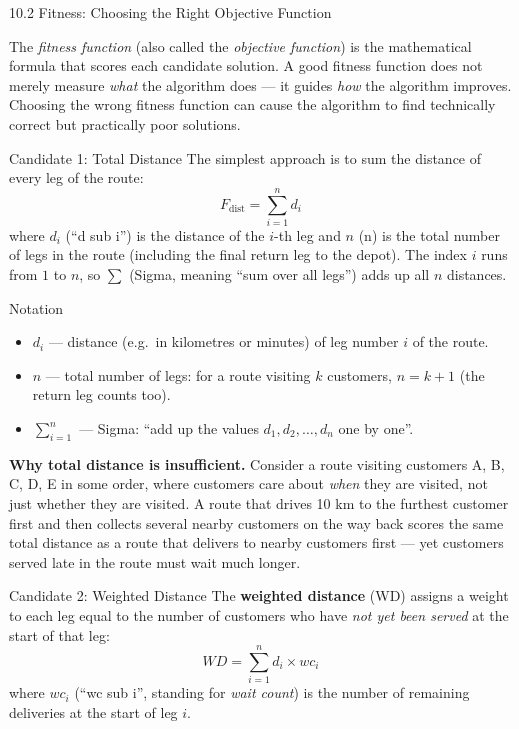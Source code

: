 \documentclass[aspectratio=169,10pt]{beamer}
\begin{document}
\begin{frame}[allowframebreaks]{10.2 Fitness: Choosing the Right Objective Function}

  The \emph{fitness function} (also called the \emph{objective
  function}) is the mathematical formula that scores each candidate
  solution.  A good fitness function does not merely measure \emph{what}
  the algorithm does — it guides \emph{how} the algorithm improves.
  Choosing the wrong fitness function can cause the algorithm to find
  technically correct but practically poor solutions.

  \framebreak

  \begin{block}{Candidate 1: Total Distance}
    The simplest approach is to sum the distance of every leg of the
    route:
    \[
      F_{\text{dist}} = \sum_{i=1}^{n} d_i
    \]
    where $d_i$ (``d sub i'') is the distance of the $i$-th leg and
    $n$ (n) is the total number of legs in the route
    (including the final return leg to the depot).
    The index $i$ runs from $1$ to $n$, so $\sum$ (Sigma, meaning
    ``sum over all legs'') adds up all $n$ distances.
  \end{block}

  \begin{block}{Notation}
    \begin{itemize}
      \item $d_i$ — distance (e.g.\ in kilometres or minutes) of leg
            number $i$ of the route.
      \item $n$ — total number of legs: for a route visiting $k$
            customers, $n = k + 1$ (the return leg counts too).
      \item $\sum_{i=1}^{n}$ — Sigma: ``add up the values
            $d_1, d_2, \ldots, d_n$ one by one''.
    \end{itemize}
  \end{block}

  \textbf{Why total distance is insufficient.}
  Consider a route visiting customers A, B, C, D, E in some order,
  where customers care about \emph{when} they are visited, not just
  whether they are visited.  A route that drives 10 km to the furthest
  customer first and then collects several nearby customers on the way
  back scores the same total distance as a route that delivers to
  nearby customers first — yet customers served late in the route must
  wait much longer.

  \framebreak

  \begin{block}{Candidate 2: Weighted Distance}
    The \textbf{weighted distance} (WD) assigns a weight to each leg
    equal to the number of customers who have \emph{not yet been
    served} at the start of that leg:
    \[
      WD = \sum_{i=1}^{n} d_i \times wc_i
    \]
    where $wc_i$ (``wc sub i'', standing for \emph{wait count}) is
    the number of remaining deliveries at the start of leg $i$.
  \end{block}


\end{frame}
\end{document}
